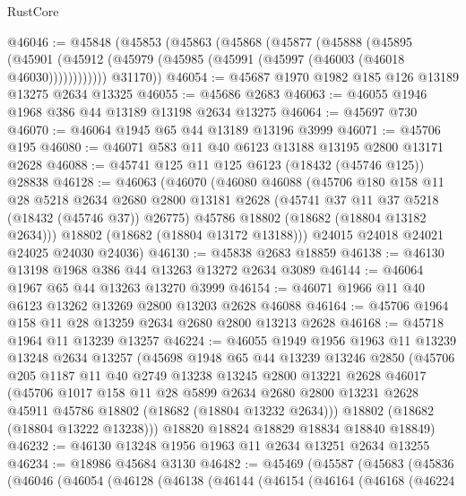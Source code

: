 \begin{lexlean}{RustCore}
\begin{coremodule}
@46046 := @45848
    (@45853
      (@45863
        (@45868
          (@45877
            (@45888
              (@45895
                (@45901 (@45912 (@45979 (@45985 (@45991 (@45997 (@46003 (@46018 @46030))))))))))))
        @31170))
@46054 := @45687 @1970 @1982 @185 @126 @13189 @13275 @2634 @13325
@46055 := @45686 @2683
@46063 := @46055 @1946 @1968 @386 @44 @13189 @13198 @2634 @13275
@46064 := @45697 @730
@46070 := @46064 @1945 @65 @44 @13189 @13196 @3999
@46071 := @45706 @195
@46080 := @46071 @583 @11 @40 @6123 @13188 @13195 @2800 @13171 @2628
@46088 := @45741 @125 @11 @125 @6123 (@18432 (@45746 @125)) @28838
@46128 := @46063
    (@46070
      (@46080
        @46088
        (@45706
          @180
          @158
          @11
          @28
          @5218
          @2634
          @2680
          @2800
          @13181
          @2628
          (@45741 @37 @11 @37 @5218 (@18432 (@45746 @37)) @26775)
          @45786
          @18802
          (@18682 (@18804 @13182 @2634)))
        @18802
        (@18682 (@18804 @13172 @13188)))
      @24015
      @24018
      @24021
      @24025
      @24030
      @24036)
@46130 := @45838 @2683 @18859
@46138 := @46130 @13198 @1968 @386 @44 @13263 @13272 @2634 @3089
@46144 := @46064 @1967 @65 @44 @13263 @13270 @3999
@46154 := @46071 @1966 @11 @40 @6123 @13262 @13269 @2800 @13203 @2628 @46088
@46164 := @45706 @1964 @158 @11 @28 @13259 @2634 @2680 @2800 @13213 @2628
@46168 := @45718 @1964 @11 @13239 @13257
@46224 := @46055
    @1949
    @1956
    @1963
    @11
    @13239
    @13248
    @2634
    @13257
    (@45698
      @1948
      @65
      @44
      @13239
      @13246
      @2850
      (@45706
        @205
        @1187
        @11
        @40
        @2749
        @13238
        @13245
        @2800
        @13221
        @2628
        @46017
        (@45706
          @1017
          @158
          @11
          @28
          @5899
          @2634
          @2680
          @2800
          @13231
          @2628
          @45911
          @45786
          @18802
          (@18682 (@18804 @13232 @2634)))
        @18802
        (@18682 (@18804 @13222 @13238)))
      @18820
      @18824
      @18829
      @18834
      @18840
      @18849)
@46232 := @46130 @13248 @1956 @1963 @11 @2634 @13251 @2634 @13255
@46234 := @18986 @45684 @3130
@46482 := @45469
    (@45587
      (@45683
        (@45836
          (@46046
            (@46054
              (@46128
                (@46138
                  (@46144
                    (@46154
                      (@46164
                        (@46168
                          (@46224

\end{coremodule}
\end{lexlean}
